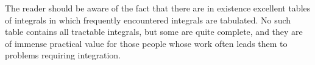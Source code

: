 The reader should be aware of the fact that there are in existence excellent tables of integrals in which frequently encountered integrals are tabulated. No such table contains all tractable integrals, but some are quite complete, and they are of immense practical value for those people
whose work often leads them to problems requiring integration.

